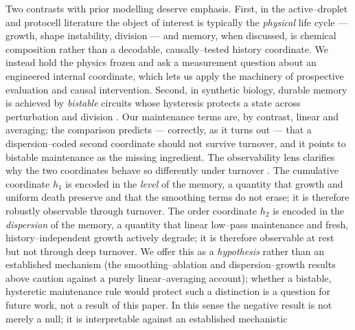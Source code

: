 \documentclass[11pt]{article}
\begin{document}
Two contrasts with prior modelling deserve emphasis. First, in the active--droplet and protocell literature the
object of interest is typically the \emph{physical} life cycle --- growth, shape instability, division
\citep{zwicker2017,hanczyc2003} --- and memory, when discussed, is chemical composition rather than a decodable,
causally--tested history coordinate. We instead hold the physics frozen and ask a measurement question about an
engineered internal coordinate, which lets us apply the machinery of prospective evaluation and causal intervention.
Second, in synthetic biology, durable memory is achieved by \emph{bistable} circuits whose hysteresis protects a
state across perturbation and division \citep{gardner2000,elowitz2000,ferrell2002}. Our maintenance terms are, by
contrast, linear and averaging; the comparison predicts --- correctly, as it turns out --- that a dispersion--coded
second coordinate should not survive turnover, and it points to bistable maintenance as the missing ingredient. The observability lens clarifies why the two coordinates behave so differently under turnover \citep{hermann1977}. The cumulative coordinate $h_1$ is encoded in the \emph{level} of the memory, a quantity that growth and uniform death preserve and that the smoothing terms do not erase; it is therefore robustly observable through turnover. The order coordinate $h_2$ is encoded in the \emph{dispersion} of the memory, a quantity that linear low--pass maintenance and fresh, history--independent growth actively degrade; it is therefore observable at rest but not through deep turnover. We offer this as a \emph{hypothesis} rather than an established mechanism (the smoothing--ablation and dispersion--growth results above caution against a purely linear--averaging account); whether a bistable, hysteretic maintenance rule would protect such a distinction \citep{gardner2000,ferrell2002,ptashne2004} is a question for future work, not a result of this paper. In
this sense the negative result is not merely a null; it is interpretable against an established mechanistic
\end{document}
